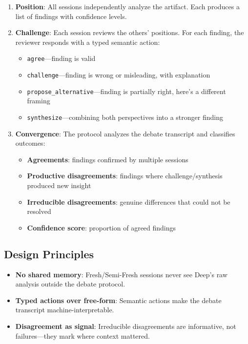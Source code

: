 \documentclass[11pt]{article}
\begin{document}
\begin{enumerate}[label=\arabic*., leftmargin=1.5em]
  \item \textbf{Position}: All sessions independently analyze the artifact. Each produces a list of findings with confidence levels.
  \item \textbf{Challenge}: Each session reviews the others' positions. For each finding, the reviewer responds with a typed semantic action:
  \begin{itemize}[leftmargin=1em]
    \item \texttt{agree}---finding is valid
    \item \texttt{challenge}---finding is wrong or misleading, with explanation
    \item \texttt{propose\_alternative}---finding is partially right, here's a different framing
    \item \texttt{synthesize}---combining both perspectives into a stronger finding
  \end{itemize}
  \item \textbf{Convergence}: The protocol analyzes the debate transcript and classifies outcomes:
  \begin{itemize}[leftmargin=1em]
    \item \textbf{Agreements}: findings confirmed by multiple sessions
    \item \textbf{Productive disagreements}: findings where challenge/synthesis produced new insight
    \item \textbf{Irreducible disagreements}: genuine differences that could not be resolved
    \item \textbf{Confidence score}: proportion of agreed findings
  \end{itemize}
\end{enumerate}

\subsection{Design Principles}
\label{sec:principles}

\begin{itemize}[leftmargin=1.5em]
  \item \textbf{No shared memory}: Fresh/Semi-Fresh sessions never see Deep's raw analysis outside the debate protocol.
  \item \textbf{Typed actions over free-form}: Semantic actions make the debate transcript machine-interpretable.
  \item \textbf{Disagreement as signal}: Irreducible disagreements are informative, not failures---they mark where context mattered.
\end{itemize}
\end{document}
